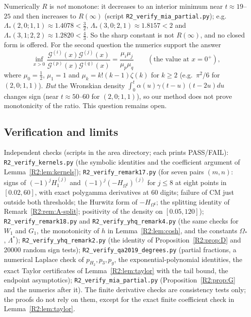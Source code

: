 \documentclass[11pt]{amsart}
\theoremstyle{definition}
\theoremstyle{remark}
\begin{document}
\noindent Numerically $R$ is \emph{not} monotone: it decreases to an interior
minimum near $t\approx19$--$25$ and then increases to $R(\infty)$ (script
\texttt{R2\_\allowbreak{}verify\_\allowbreak{}mia\_\allowbreak{}partial.py}); e.g.\
$\Lambda_*(2,0;1,1)\approx1.4078<\frac32$, $\Lambda_*(3,0;2,1)\approx1.8157<2$
and $\Lambda_*(3,1;2,2)\approx1.2820<\frac43$. So the sharp constant is not
$R(\infty)$, and no closed form is offered. For the second question the
numerics support the answer
\[
 \inf_{x>0}\frac{\mathcal G^{(i)}(x)\mathcal G^{(j)}(x)}{\mathcal G^{(p)}(x)\mathcal G^{(q)}(x)}
 =\frac{\mu_i\mu_j}{\mu_p\mu_q}\qquad(\text{the value at }x=0^+),
\]
where $\mu_0=\frac12$,
$\mu_1=1$ and $\mu_k=k!(k-1)\zeta(k)$ for $k\ge2$ (e.g.\ $\pi^2/6$ for
$(2,0;1,1)$). \emph{But} the Wronskian density
$\int_0^t\alpha(u)\gamma(t-u)(t-2u)du$ changes sign (near $t\approx50$--$60$ for
$(2,0;1,1)$), so our method does not prove monotonicity of the ratio. This
question remains open.

\subsection{Verification and limits}
\label{R2:subsec:verif}

{\sloppy
Independent checks (scripts in the area directory; each prints PASS/FAIL):
\texttt{R2\_\allowbreak{}verify\_\allowbreak{}kernels.py} (the symbolic identities and the coefficient
argument of Lemma~\ref{R2:lem:kernels}); \texttt{R2\_\allowbreak{}verify\_\allowbreak{}remark17.py} (for
seven pairs $(m,n)$: signs of $(-1)^jH_1^{(j)}$ and
$(-1)^j(-H_{\Omega^\sharp})^{(j)}$ for $j\le8$ at eight points in $[0.02,60]$,
with exact polygamma derivatives at 60 digits; failure of CM just outside
both thresholds; the Hurwitz form of $-H_{\Omega^\sharp}$; the splitting
identity of Remark~\ref{R2:rem:A-split}; positivity of the density on
$[0.05,120]$); \texttt{R2\_\allowbreak{}verify\_\allowbreak{}remark18.py} and
\texttt{R2\_\allowbreak{}verify\_\allowbreak{}yhq\_\allowbreak{}remark4.py} (the same checks for $W_1$ and $G_1$, the
monotonicity of $h$ in Lemma~\ref{R2:lem:cosh}, and the constants
$\Omega_*$, $\Lambda^*$); \texttt{R2\_\allowbreak{}verify\_\allowbreak{}yhq\_\allowbreak{}remark2.py} (the identity of
Proposition~\ref{R2:prop:D} and 20000 random sign tests);
\texttt{R2\_\allowbreak{}verify\_\allowbreak{}qa2019\_\allowbreak{}degrees.py} (partial fractions, a numerical Laplace
check of $p_{H_2},p_3,p_g$, the exponential-polynomial identities, the exact
Taylor certificates of Lemma~\ref{R2:lem:taylor} with the tail bound, the
endpoint asymptotics); \texttt{R2\_\allowbreak{}verify\_\allowbreak{}mia\_\allowbreak{}partial.py}
(Proposition~\ref{R2:prop:G} and the numerics after it). The finite
derivative checks are consistency tests only; the proofs do not rely on
them, except for the exact finite coefficient check in
Lemma~\ref{R2:lem:taylor}.\par}
\end{document}
